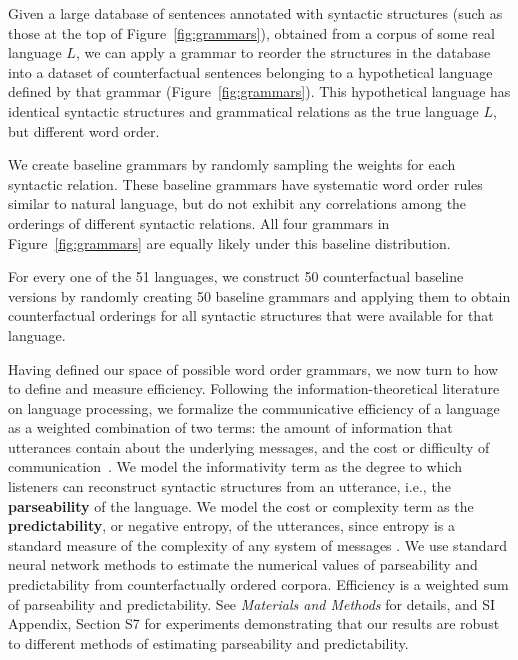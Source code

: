 \documentclass[9pt,twocolumn,twoside,lineno]{pnas-new}
\newcommand{\key}[1]{\textbf{#1}}
\begin{document}
Given a large database of sentences annotated with syntactic structures (such as those at the top of Figure~\ref{fig:grammars}), obtained from a corpus of some real language $L$, we can apply a grammar to reorder the structures in the database into a dataset of counterfactual sentences belonging to a hypothetical language defined by that grammar (Figure~\ref{fig:grammars}).
This hypothetical language has identical syntactic structures and grammatical relations as the true language $L$, but different word order.

We create baseline grammars by randomly sampling the weights for each syntactic relation.
These baseline grammars have systematic word order rules similar to natural language, but do not exhibit any correlations among the orderings of different syntactic relations.
All four grammars in Figure~\ref{fig:grammars} are equally likely under this baseline distribution.

For every one of the 51 languages, we construct 50 counterfactual baseline versions by randomly creating 50 baseline grammars and applying them to obtain counterfactual orderings for all syntactic structures that were available for that language.

Having defined our space of possible word order grammars, we now turn to how to define and measure efficiency. 
Following the information-theoretical literature on language processing, 
we formalize the communicative efficiency of a language as a weighted combination of two terms:  the 
amount of information that utterances contain about the underlying messages, and the  cost or difficulty of communication~\cite{ferreri2003least,frank2012predicting,zaslavsky2018efficient,kemp2012kinship,regier2015word,goodman2013knowledge}.
We model the informativity term as the 
degree to which listeners can reconstruct syntactic structures from an utterance, i.e., the \key{parseability} of the language. We model the cost or complexity term as the 
\key{predictability}, or negative entropy, of the utterances, since entropy is a standard measure of the complexity of any system of messages \cite{shannon1948mathematical}.
We use standard neural network methods to estimate the numerical values of parseability and predictability from counterfactually ordered corpora.
Efficiency is a weighted sum of parseability and predictability.
See \textit{Materials and Methods} for details, and SI Appendix, Section S7 for experiments demonstrating that our results are robust to different methods of estimating parseability and predictability.
\end{document}
